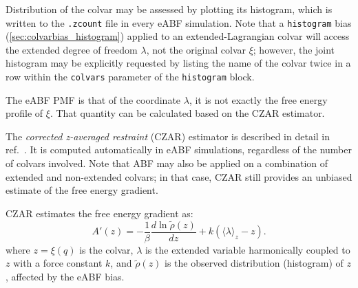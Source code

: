 Distribution of the colvar may be assessed by plotting its histogram, which
is written to the \outputName\texttt{.zcount} file in every eABF simulation.
Note that a \texttt{histogram} bias (\ref{sec:colvarbias_histogram})
applied to an extended-Lagrangian colvar
will access the extended degree of freedom $\lambda$, not the original colvar $\xi$;
however, the joint histogram may be explicitly requested by listing the name of the
colvar twice in a row within the \texttt{colvars} parameter of the \texttt{histogram} block.

The eABF PMF is that of the coordinate $\lambda$, it is not exactly the free energy profile of $\xi$.
That quantity can be calculated based on  the CZAR
estimator.



The \emph{corrected z-averaged restraint} (CZAR) estimator
is described in detail in ref.\ \citealp{Lesage2017}.
It is computed automatically in eABF simulations,
regardless of the number of colvars involved.
Note that ABF may also be applied on a combination of extended and non-extended
colvars; in that case, CZAR still provides an unbiased estimate of the free energy gradient.

CZAR estimates the free energy gradient as:
\begin{equation}
A'(z) = - \frac{1}{\beta} \frac{d\ln  \tilde \rho (z)}{dz}  + k (\langle\lambda\rangle_z - z).
\label{eq:czar}
\end{equation}
where $z=\xi(q)$ is the colvar, $\lambda$ is the extended variable harmonically
coupled to $z$ with a force constant $k$, and $\tilde\rho (z)$ is the observed
distribution (histogram) of $z$, affected by the eABF bias.

